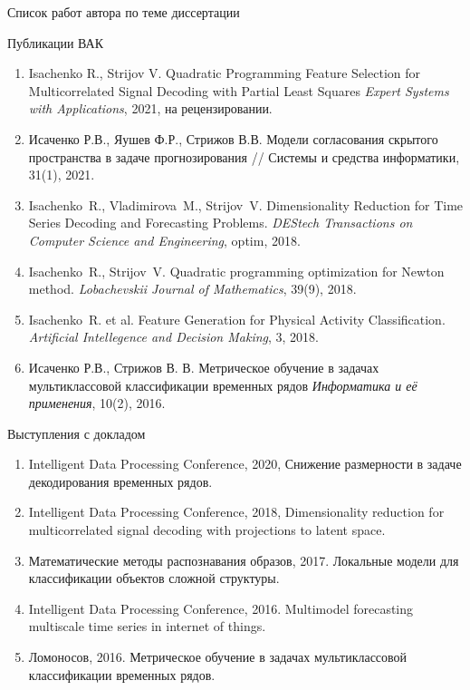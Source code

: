\documentclass[10pt]{beamer}
\begin{document}
\begin{frame}{Список работ автора по теме диссертации}
	\vspace{-0.1cm}
	\begin{block}{Публикации ВАК}
		\vspace{-0.1cm}
		{\scriptsize
		\begin{enumerate}
			\item Isachenko R., Strijov V. Quadratic Programming Feature Selection for Multicorrelated Signal Decoding with Partial Least Squares \emph{Expert Systems with Applications}, 2021, на рецензировании.
			\item Исаченко Р.В., Яушев Ф.Р., Стрижов В.В. Модели согласования скрытого пространства в задаче прогнозирования // Системы и средства информатики, 31(1), 2021.
			\item Isachenko~R., Vladimirova~M., Strijov~V. Dimensionality Reduction for Time Series Decoding and Forecasting Problems. \emph{DEStech Transactions on Computer Science and Engineering}, optim, 2018.
			\item Isachenko~R., Strijov~V. Quadratic programming optimization for Newton method. \emph{Lobachevskii Journal of Mathematics}, 39(9), 2018.
			\item Isachenko~R. et al. Feature Generation for Physical Activity Classification. \emph{Artificial Intellegence and Decision Making}, 3, 2018.
			\item Исаченко Р.В., Стрижов В. В. Метрическое обучение в задачах мультиклассовой классификации временных рядов \emph{Информатика и её применения}, 10(2), 2016.
		\end{enumerate}
	}
	\end{block}
\vspace{-0.3cm}
\begin{block}{Выступления с докладом}
	\vspace{-0.1cm}
	{\scriptsize
	\begin{enumerate}
		\item  Intelligent Data Processing Conference, 2020, Снижение размерности в задаче декодирования временных рядов.
		\item  Intelligent Data Processing Conference, 2018, Dimensionality reduction for multicorrelated signal decoding with projections to latent space. 
		\item Математические методы распознавания образов, 2017. Локальные модели для классификации объектов сложной структуры.
		\item Intelligent Data Processing Conference, 2016. Multimodel forecasting multiscale time series in internet of things.
		\item Ломоносов, 2016. Метрическое обучение в задачах мультиклассовой классификации временных рядов.
	\end{enumerate}
	}
\end{block}
\end{frame}
\end{document}
